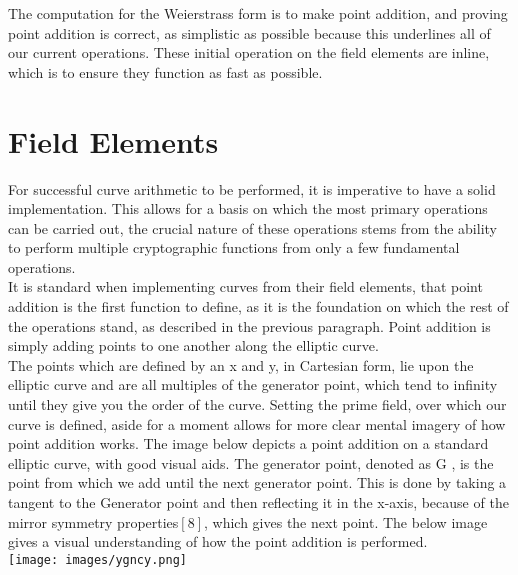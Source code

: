 \documentclass[letterpaper, 10 pt, conference]{ieeeconf}  %
\begin{document}
The computation for the Weierstrass form is to make point addition, and proving point addition is correct, as simplistic as possible because this underlines all of our current operations. These initial operation on the field elements are inline, which is to ensure they function as fast as possible. \\

\section{Field Elements}
For successful curve arithmetic to be performed, it is imperative to have a solid implementation. This allows for a basis on which the most primary operations can be carried out, the crucial nature of these operations stems from the ability to perform multiple cryptographic functions from only a few fundamental operations. \\
It is standard when implementing curves from their field elements, that point addition is the first function to define, as it is the foundation on which the rest of the operations stand, as described in the previous paragraph. Point addition is simply adding points to one another along the elliptic curve.\\
The points which are defined by an x and y, in Cartesian form, lie upon the elliptic curve and are all multiples of the generator point, which tend to infinity until they give you the order of the curve. Setting the prime field, over which our curve is defined, aside for a moment allows for more clear mental imagery of how point addition works. The image below depicts a point addition on a standard elliptic curve, with good visual aids. The generator point, denoted as G , is the point from which we add until the next generator point. This is done by taking a tangent to the Generator point and then reflecting it in the x-axis, because of the mirror symmetry properties$[8]$, which gives the next point. The below image gives a visual understanding of how the point addition is performed.
\\

\texttt{[image: images/ygncy.png]}\\
\end{document}
